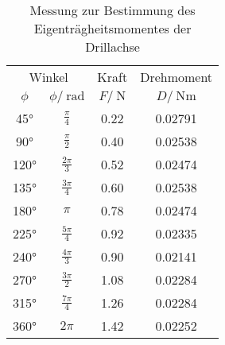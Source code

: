 
\begin{table}
	\centering
	\caption{Messung zur Bestimmung des Eigenträgheitsmomentes der Drillachse}
	\label{tab:M1 I_D}
	\def\arraystretch{1.5} %
	\begin{tabular}{cccc}
	\toprule
	\multicolumn{2}{c}{Winkel} & {Kraft} & {Drehmoment} \\
	{$\phi$} & {$\phi/\:\text{rad}$} & {$F/\:\si{\newton}$} & {$D/\:\si{\newton\meter}$}\\
	\midrule
 45$\text{°}$ & $\frac{\pi}{4}$  & 0.22 & 0.02791\\ 
 90$\text{°}$ & $\frac{\pi}{2}$  & 0.40 & 0.02538\\
120$\text{°}$ & $\frac{2\pi}{3}$  & 0.52 & 0.02474\\
135$\text{°}$ & $\frac{3\pi}{4}$  & 0.60 & 0.02538\\
180$\text{°}$ & $\pi$              & 0.78 & 0.02474\\
225$\text{°}$ & $\frac{5\pi}{4}$  & 0.92 & 0.02335\\
240$\text{°}$ & $\frac{4\pi}{3}$  & 0.90 & 0.02141\\
270$\text{°}$ & $\frac{3\pi}{2}$  & 1.08 & 0.02284\\
315$\text{°}$ & $\frac{7\pi}{4}$  & 1.26 & 0.02284\\
360$\text{°}$ & $2\pi$              & 1.42 & 0.02252\\
	\bottomrule
	\end{tabular}
\end{table}


